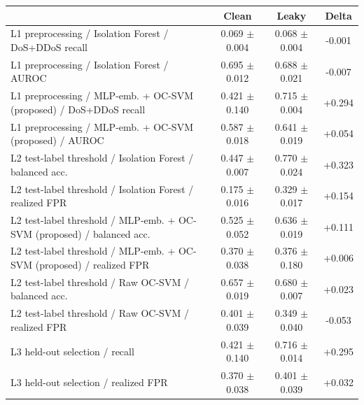 \begin{tabular}{lccc}
\toprule
 & Clean & Leaky & Delta \\
\midrule
L1 preprocessing / Isolation Forest / DoS+DDoS recall & 0.069 $\pm$ 0.004 & 0.068 $\pm$ 0.004 & -0.001 \\
L1 preprocessing / Isolation Forest / AUROC & 0.695 $\pm$ 0.012 & 0.688 $\pm$ 0.021 & -0.007 \\
L1 preprocessing / MLP-emb. + OC-SVM (proposed) / DoS+DDoS recall & 0.421 $\pm$ 0.140 & 0.715 $\pm$ 0.004 & +0.294 \\
L1 preprocessing / MLP-emb. + OC-SVM (proposed) / AUROC & 0.587 $\pm$ 0.018 & 0.641 $\pm$ 0.019 & +0.054 \\
L2 test-label threshold / Isolation Forest / balanced acc. & 0.447 $\pm$ 0.007 & 0.770 $\pm$ 0.024 & +0.323 \\
L2 test-label threshold / Isolation Forest / realized FPR & 0.175 $\pm$ 0.016 & 0.329 $\pm$ 0.017 & +0.154 \\
L2 test-label threshold / MLP-emb. + OC-SVM (proposed) / balanced acc. & 0.525 $\pm$ 0.052 & 0.636 $\pm$ 0.019 & +0.111 \\
L2 test-label threshold / MLP-emb. + OC-SVM (proposed) / realized FPR & 0.370 $\pm$ 0.038 & 0.376 $\pm$ 0.180 & +0.006 \\
L2 test-label threshold / Raw OC-SVM / balanced acc. & 0.657 $\pm$ 0.019 & 0.680 $\pm$ 0.007 & +0.023 \\
L2 test-label threshold / Raw OC-SVM / realized FPR & 0.401 $\pm$ 0.039 & 0.349 $\pm$ 0.040 & -0.053 \\
L3 held-out selection / recall & 0.421 $\pm$ 0.140 & 0.716 $\pm$ 0.014 & +0.295 \\
L3 held-out selection / realized FPR & 0.370 $\pm$ 0.038 & 0.401 $\pm$ 0.039 & +0.032 \\
\bottomrule
\end{tabular}